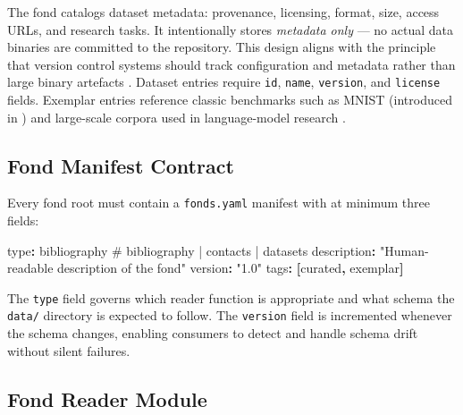 \documentclass[
]{article}
\newenvironment{Shaded}{}{}
\newcommand{\AttributeTok}[1]{\textcolor[rgb]{0.49,0.56,0.16}{#1}}
\newcommand{\FunctionTok}[1]{\textcolor[rgb]{0.02,0.16,0.49}{#1}}
\newcommand{\KeywordTok}[1]{\textcolor[rgb]{0.00,0.44,0.13}{\textbf{#1}}}
\newcommand{\StringTok}[1]{\textcolor[rgb]{0.25,0.44,0.63}{#1}}
\begin{document}
\subsubsection{\texorpdfstring{}{template_datasets}}\label{template_datasets}

The  fond catalogs dataset metadata:
provenance, licensing, format, size, access URLs, and research tasks. It
intentionally stores \emph{metadata only} --- no actual data binaries
are committed to the repository. This design aligns with the principle
that version control systems should track configuration and metadata
rather than large binary artefacts \citep{Kluyver2016jupyter}. Dataset
entries require \texttt{id}, \texttt{name}, \texttt{version}, and
\texttt{license} fields. Exemplar entries reference classic benchmarks
such as MNIST (introduced in \citep{LeCun1998gradient}) and large-scale
corpora used in language-model research \citep{Brown2020gpt3}.

\subsection{Fond Manifest Contract}\label{fond-manifest-contract}

Every fond root must contain a \texttt{fonds.yaml} manifest with at
minimum three fields:

\begin{Shaded}
\begin{Highlighting}[]
\FunctionTok{type}\KeywordTok{:}\AttributeTok{ bibliography   \# bibliography | contacts | datasets}
\FunctionTok{description}\KeywordTok{:}\AttributeTok{ }\StringTok{"Human{-}readable description of the fond"}
\FunctionTok{version}\KeywordTok{:}\AttributeTok{ }\StringTok{"1.0"}
\FunctionTok{tags}\KeywordTok{:}\AttributeTok{ }\KeywordTok{[}\AttributeTok{curated}\KeywordTok{,}\AttributeTok{ exemplar}\KeywordTok{]}
\end{Highlighting}
\end{Shaded}

The \texttt{type} field governs which reader function is appropriate and
what schema the \texttt{data/} directory is expected to follow. The
\texttt{version} field is incremented whenever the schema changes,
enabling consumers to detect and handle schema drift without silent
failures.

\subsection{Fond Reader Module}\label{fond-reader-module}
\end{document}
